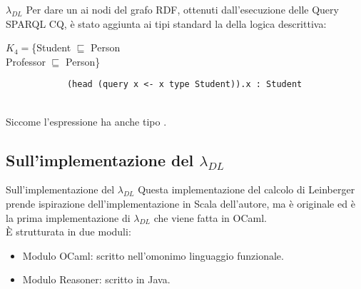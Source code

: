 \begin{frame}[containsverbatim]{$\lambda_{DL}$}
    Per dare un  ai nodi del grafo RDF, ottenuti dall'esecuzione delle Query SPARQL CQ, \`e stato aggiunta ai tipi standard la 
    della logica descrittiva:
    ~\\
    \begin{example}
        $K_4 = $\{Student $\sqsubseteq$ Person
        \\Professor $\sqsubseteq$ Person\}
        \begin{verbatim}
            (head (query x <- x type Student)).x : Student 
        \end{verbatim}
    \end{example}
    ~\\
Siccome  l'espressione ha anche tipo .
\end{frame}

\subsection{Sull'implementazione del $\lambda_{DL}$}
\begin{frame}{Sull'implementazione del $\lambda_{DL}$}
    Questa implementazione del calcolo di Leinberger prende ispirazione dell'implementazione in Scala dell'autore, ma è originale ed è la prima implementazione di $\lambda_{DL}$ che viene fatta in OCaml. 
    \\\`{E} strutturata in due moduli:
    \begin{itemize}
        \item Modulo OCaml: scritto nell'omonimo linguaggio funzionale. 
        \item Modulo Reasoner: scritto in Java.
    \end{itemize}
\end{frame}


